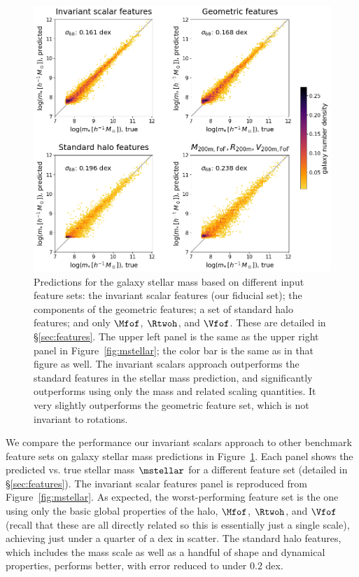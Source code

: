 \begin{figure}
    \centering
    \includegraphics[width=0.7\columnwidth]{feature_comparison_mstellar.png}
    \caption{Predictions for the galaxy stellar mass based on different input feature sets: the invariant scalar features (our fiducial set); the components of the geometric features; a set of standard halo features; and only $\Mfof$, $\Rtwoh$, and $\Vfof$. These are detailed in \S\ref{sec:features}. The upper left panel is the same as the upper right panel in Figure~\ref{fig:mstellar}; the color bar is the same as in that figure as well. The invariant scalars approach outperforms the standard features in the stellar mass prediction, and significantly outperforms using only the mass and related scaling quantities. It very slightly outperforms the geometric feature set, which is not invariant to rotations.}
    \label{fig:mstellar_compare}
\end{figure}

We compare the performance our invariant scalars approach to other benchmark feature sets on galaxy stellar mass predictions in Figure~\ref{fig:mstellar_compare}.
Each panel shows the predicted vs. true stellar mass $\mstellar$ for a different feature set (detailed in \S\ref{sec:features}).
The invariant scalar features panel is reproduced from Figure~\ref{fig:mstellar}.
As expected, the worst-performing feature set is the one using only the basic global properties of the halo, $\Mfof$, $\Rtwoh$, and $\Vfof$ (recall that these are all directly related so this is essentially just a single scale), achieving just under a quarter of a dex in scatter.
The standard halo features, which includes the mass scale as well as a handful of shape and dynamical properties, performs better, with error reduced to under 0.2 dex. 

